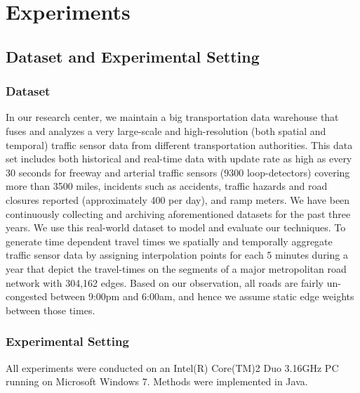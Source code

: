 \section{Experiments}
\label{sec:experiments}
\subsection{Dataset and Experimental Setting}
\subsubsection{Dataset}
\label{subsec:Dataset}
In our research center, we maintain a big transportation data warehouse that fuses and analyzes a very large-scale and high-resolution (both spatial and temporal) traffic sensor data from different transportation authorities.  This data set includes both historical and real-time data with update
rate as high as every 30 seconds for freeway and arterial traffic sensors (9300 loop-detectors) covering more than 3500 miles, incidents  such as accidents, traffic hazards and road closures reported (approximately 400 per day), and ramp meters. 
We have been continuously collecting and archiving aforementioned datasets for the past three years. We use this real-world dataset to model and evaluate our techniques. To generate time dependent  travel times we spatially and temporally aggregate traffic sensor data by assigning interpolation points for each 5 minutes during a year that
depict the travel-times on the segments of a major metropolitan road network with 304,162
edges. Based on our observation, all roads are fairly un-congested between 9:00pm and 6:00am, and hence we assume static edge weights between those times.

\subsubsection{Experimental Setting}
All experiments were conducted on an Intel(R) Core(TM)2 Duo 3.16GHz PC running on Microsoft Windows 7. Methods were implemented in Java.

